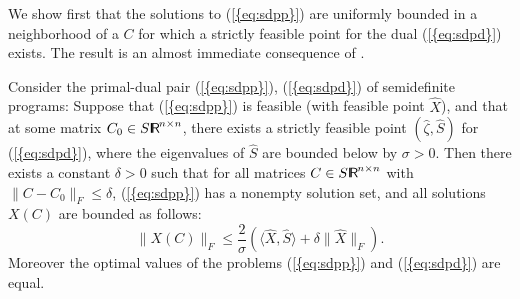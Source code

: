 \documentclass{siamltex}
\begin{document}
We show first that the solutions to {(\ref{{eq:sdpp}})} are uniformly bounded in a
neighborhood of a $C$ for which a strictly feasible point for the dual
{(\ref{{eq:sdpd}})} exists. The result is an almost immediate consequence
of \cite[Theorem~4.1]{Tod01a}.
\begin{lemma} \label{lem:bd} Consider the primal-dual pair
  {(\ref{{eq:sdpp}})}, {(\ref{{eq:sdpd}})} of semidefinite programs: Suppose
  that {(\ref{{eq:sdpp}})} is feasible (with feasible point $\hat{X}$),
  and that at some matrix $C_0 \in S {\makebox{\sf I \hspace{-8.5 pt} R \hspace{-4.0pt}}}^{n \times n}$, there exists a
  strictly feasible point $(\hat{\zeta},\hat{S})$ for {(\ref{{eq:sdpd}})},
  where the eigenvalues of $\hat{S}$ are bounded below by
  $\sigma>0$. Then there exists a constant $\delta>0$ such that for
  all matrices $C \in S {\makebox{\sf I \hspace{-8.5 pt} R \hspace{-4.0pt}}}^{n \times n}$ with $\|C-C_0\|_F \le
  \delta$, {(\ref{{eq:sdpp}})} has a nonempty solution set, and all
  solutions $X(C)$ are bounded as follows:
\[
\| X (C) \|_F \le \frac{2}{\sigma} (\langle \hat{X}, \hat{S} \rangle + 
\delta \|\hat{X} \|_F).
\]
Moreover the optimal values of the problems {(\ref{{eq:sdpp}})} and
{(\ref{{eq:sdpd}})} are equal.
\end{lemma}
\end{document}
